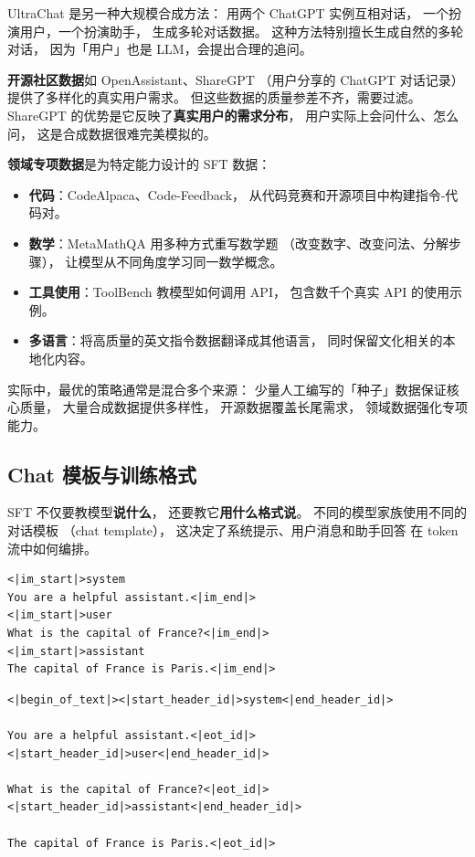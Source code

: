 
UltraChat 是另一种大规模合成方法：
用两个 ChatGPT 实例互相对话，
一个扮演用户，一个扮演助手，
生成多轮对话数据。
这种方法特别擅长生成自然的多轮对话，
因为「用户」也是 LLM，会提出合理的追问。

\textbf{开源社区数据}如 OpenAssistant、ShareGPT
（用户分享的 ChatGPT 对话记录）
提供了多样化的真实用户需求。
但这些数据的质量参差不齐，需要过滤。
ShareGPT 的优势是它反映了\textbf{真实用户的需求分布}，
用户实际上会问什么、怎么问，
这是合成数据很难完美模拟的。

\textbf{领域专项数据}是为特定能力设计的 SFT 数据：
\begin{itemize}[noitemsep]
  \item \textbf{代码}：CodeAlpaca、Code-Feedback，
        从代码竞赛和开源项目中构建指令-代码对。
  \item \textbf{数学}：MetaMathQA 用多种方式重写数学题
       （改变数字、改变问法、分解步骤），
        让模型从不同角度学习同一数学概念。
  \item \textbf{工具使用}：ToolBench 教模型如何调用 API，
        包含数千个真实 API 的使用示例。
  \item \textbf{多语言}：将高质量的英文指令数据翻译成其他语言，
        同时保留文化相关的本地化内容。
\end{itemize}

实际中，最优的策略通常是混合多个来源：
少量人工编写的「种子」数据保证核心质量，
大量合成数据提供多样性，
开源数据覆盖长尾需求，
领域数据强化专项能力。

\subsection{Chat 模板与训练格式}

SFT 不仅要教模型\textbf{说什么}，
还要教它\textbf{用什么格式说}。
不同的模型家族使用不同的对话模板
（chat template），
这决定了系统提示、用户消息和助手回答
在 token 流中如何编排。

\begin{lstlisting}[caption={ChatML format (used by GPT/Qwen)}]
<|im_start|>system
You are a helpful assistant.<|im_end|>
<|im_start|>user
What is the capital of France?<|im_end|>
<|im_start|>assistant
The capital of France is Paris.<|im_end|>
\end{lstlisting}

\begin{lstlisting}[caption={Llama 3 format}]
<|begin_of_text|><|start_header_id|>system<|end_header_id|>

You are a helpful assistant.<|eot_id|>
<|start_header_id|>user<|end_header_id|>

What is the capital of France?<|eot_id|>
<|start_header_id|>assistant<|end_header_id|>

The capital of France is Paris.<|eot_id|>
\end{lstlisting}


